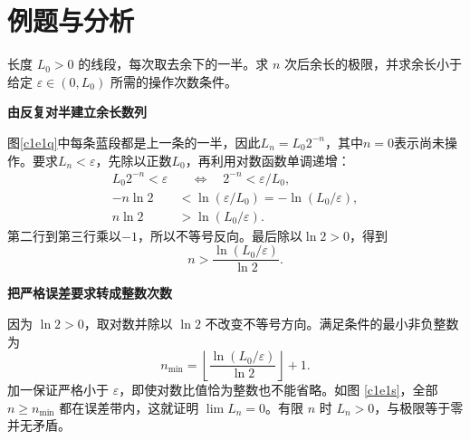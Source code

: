 \section{例题与分析}
\begin{question}
\begin{example}[反复对半与误差标准]
长度 $L_0>0$ 的线段，每次取去余下的一半。求 $n$ 次后余长的极限，并求余长小于给定 $\varepsilon\in(0,L_0)$ 所需的操作次数条件。
\end{example}
\end{question}
\begin{solution}\textbf{由反复对半建立余长数列}\par\nobreak
图\ref{c1e1q}中每条蓝段都是上一条的一半，因此$L_n=L_0 2^{-n}$，其中$n=0$表示尚未操作。要求$L_n<\varepsilon$，先除以正数$L_0$，再利用对数函数单调递增：
\begin{align*}
L_0 2^{-n}<\varepsilon
&\quad\Longleftrightarrow\quad 2^{-n}<\varepsilon/L_0,\\
-n\ln2&<\ln(\varepsilon/L_0)=-\ln(L_0/\varepsilon),\\
n\ln2&>\ln(L_0/\varepsilon).
\end{align*}
第二行到第三行乘以$-1$，所以不等号反向。最后除以$\ln2>0$，得到
\[
n>\frac{\ln(L_0/\varepsilon)}{\ln2}.
\]


\par\medskip{}\noindent\textbf{把严格误差要求转成整数次数}\par\nobreak
因为 $\ln2>0$，取对数并除以 $\ln2$ 不改变不等号方向。满足条件的最小非负整数为
\[
 n_{\min}=\left\lfloor\frac{\ln(L_0/\varepsilon)}{\ln2}\right\rfloor+1.
\]
加一保证严格小于 $\varepsilon$，即使对数比值恰为整数也不能省略。如图 \ref{c1e1s}，全部 $n\ge n_{\min}$ 都在误差带内，这就证明 $\lim L_n=0$。有限 $n$ 时 $L_n>0$，与极限等于零并无矛盾。
\end{solution}


